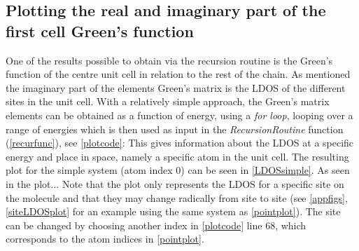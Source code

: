 \subsection{Plotting the real and imaginary part of the first cell Green's function}
One of the results possible to obtain via the recursion routine is the Green's function of the centre unit cell in relation to the rest of the chain. As mentioned the imaginary part of the elements Green's matrix is the LDOS of the different sites in the unit cell. With a relatively simple approach, the Green's matrix elements can be obtained as a function of energy, using a \textit{for loop}, looping over a range of energies which is then used as input in the \textit{RecursionRoutine} function (\cref{recurfunc}), see \cref{plotcode}:
\vspace{-1\baselineskip}
\vspace{\baselineskip}
This gives information about the LDOS at a specific energy and place in space, namely a specific atom in the unit cell. The resulting plot for the simple system (atom index 0) can be seen in \cref{LDOSsimple}. As seen in the plot... Note that the plot only represents the LDOS for a specific site on the molecule and that they may change radically from site to site (see \cref{appfigs}, \cref{siteLDOSplot} for an example using the same system as \cref{pointplot}). The site can be changed by choosing another index in \cref{plotcode} line 68, which corresponds to the atom indices in \cref{pointplot}. 
